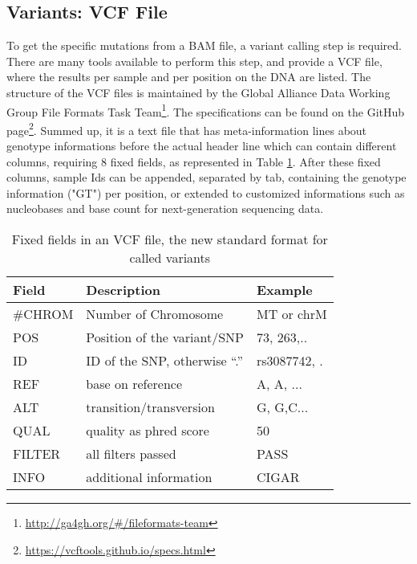 \subsection{Variants: VCF File}\label{intro:VCF}
To get the specific mutations from a BAM file, a variant calling step is required. There are many tools available to perform this step, and provide a VCF file, where the results per sample and per position on the DNA are listed. The structure of the VCF files is maintained by the Global Alliance Data Working Group File Formats Task Team\footnote{\url{http://ga4gh.org/\#/fileformats-team}}. The specifications can be found on the GitHub page\footnote{\url{https://vcftools.github.io/specs.html}}. Summed up, it is a text file that has meta-information lines about genotype informations before the actual header line which can contain different columns, requiring 8 fixed fields, as represented in Table \ref{table:vcf}. After these fixed columns, sample Ids can be appended, separated by tab, containing the genotype information ("GT") per position, or extended to customized informations such as nucleobases and base count for next-generation sequencing data.

\begin{table}[H]
  \begin{tabular}{lll}
    \toprule
    Field & Description & Example \\
		\midrule
    \#CHROM & Number of Chromosome & MT or chrM \\
    POS & Position of the variant/SNP & 73, 263,.. \\
    ID & ID of the SNP, otherwise "`."' & rs3087742, .\\
    REF & base on reference & A, A, ...\\
    ALT & transition/transversion & G, G,C...\\
    QUAL & quality as phred score & 50 \\
    FILTER & all filters passed & PASS \\
    INFO & additional information & CIGAR \\
		\bottomrule
\end{tabular}
\caption{Fixed fields in an VCF file, the new standard format for called variants}
\label{table:vcf}
\end{table}

